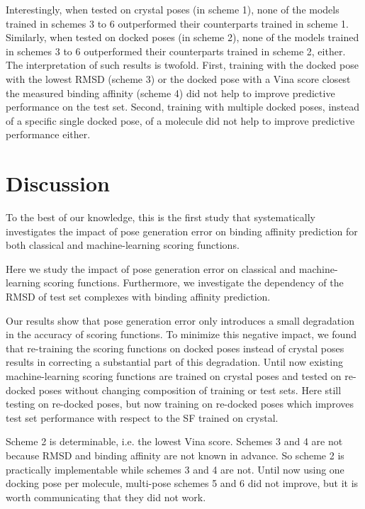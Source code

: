 \documentclass[twocolumn]{bmcart}
\begin{document}
Interestingly, when tested on crystal poses (in scheme 1), none of the models trained in schemes 3 to 6 outperformed their counterparts trained in scheme 1. Similarly, when tested on docked poses (in scheme 2), none of the models trained in schemes 3 to 6 outperformed their counterparts trained in scheme 2, either. The interpretation of such results is twofold. First, training with the docked pose with the lowest RMSD (scheme 3) or the docked pose with a Vina score closest the measured binding affinity (scheme 4) did not help to improve predictive performance on the test set. Second, training with multiple docked poses, instead of a specific single docked pose, of a molecule did not help to improve predictive performance either.

\section*{Discussion}

To the best of our knowledge, this is the first study that systematically investigates the impact of pose generation error on binding affinity prediction for both classical and machine-learning scoring functions.

Here we study the impact of pose generation error on classical and machine-learning scoring functions. Furthermore, we investigate the dependency of the RMSD of test set complexes with binding affinity prediction. %

Our results show that pose generation error only introduces a small degradation in the accuracy of scoring functions. To minimize this negative impact, we found that re-training the scoring functions on docked poses instead of crystal poses results in correcting a substantial part of this degradation. Until now existing machine-learning scoring functions are trained on crystal poses and tested on re-docked poses without changing composition of training or test sets. Here still testing on re-docked poses, but now training on re-docked poses which improves test set performance with respect to the SF trained on crystal.

Scheme 2 is determinable, i.e. the lowest Vina score. Schemes 3 and 4 are not because RMSD and binding affinity are not known in advance. So scheme 2 is practically implementable while schemes 3 and 4 are not. Until now using one docking pose per molecule, multi-pose schemes 5 and 6 did not improve, but it is worth communicating that they did not work.
\end{document}
